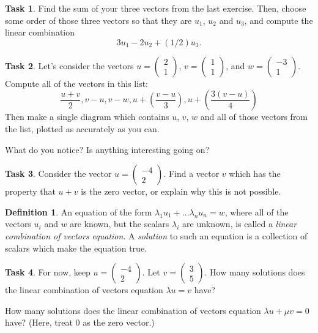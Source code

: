 \documentclass{tufte-book}
\theoremstyle{definition}
\newtheorem{task}{Task}
\newtheorem*{definition}{Definition}
\begin{document}
\begin{task}
Find the sum of your three vectors from the last exercise. Then, choose some order of those three vectors so that they are $u_1$, $u_2$ and $u_3$, and compute the linear combination
\[
3u_1 - 2u_2 + (1/2)u_3.
\] 
\end{task}

\begin{task}
Let's consider the vectors $u=\left(\begin{smallmatrix} 2 \\1 \end{smallmatrix}\right)$, 
$v=\left(\begin{smallmatrix} 1\\ 1 \end{smallmatrix}\right)$, and $w=\left(\begin{smallmatrix} -3\\ 1 \end{smallmatrix}\right)$.
Compute all of the vectors in this list:
\[
\dfrac{u+v}{2}, v-u, v-w, u + \left(\dfrac{v-u}{3}\right), u + \left(\dfrac{3(v-u)}{4}\right)
\]
Then make a single diagram which contains $u$, $v$, $w$ and all of those vectors from the list, plotted as accurately as you can.

What do you notice? Is anything interesting going on?
\end{task}

\begin{task}
Consider the vector $u = \left(\begin{smallmatrix} -4 \\ 2\end{smallmatrix}\right)$. Find a vector $v$ which has the property that $u+v$ is the zero vector, or explain why this is not possible.
\end{task}

\begin{definition}
An equation of the form $\lambda_1 u_1 + \dots \lambda_n u_n = w$, where all of the vectors $u_i$ and $w$ are known, but the scalars $\lambda_i$ are unknown, is called a \emph{linear combination of vectors equation}. A \emph{solution} to such an equation is 
a collection of scalars which make the equation true.
\end{definition}

\begin{task}
For now, keep $u = \left(\begin{smallmatrix} -4 \\ 2\end{smallmatrix}\right)$. 
Let $v = \left(\begin{smallmatrix} 3 \\ 5 \end{smallmatrix}\right)$.
How many solutions does the linear combination of vectors equation
$\lambda u = v$
have?

How many solutions does the linear combination of vectors equation 
$\lambda u + \mu v = 0$
have? (Here, treat $0$ as the zero vector.)
\end{task}
\end{document}
